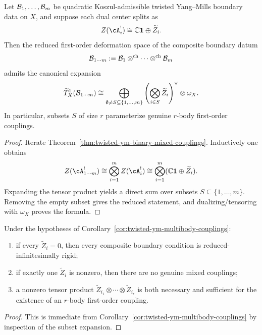 \begin{corollary}
\label{cor:twisted-ym-multibody-couplings}
Let $\mathcal{B}_1,\dots,\mathcal{B}_m$ be quadratic Koszul-admissible twisted Yang--Mills boundary data on $X$, and suppose each dual center splits as
\[
Z(\cA_i^{!}) \cong \mathbb{C}\mathbf{1}\oplus \widetilde Z_i.
\]
Then the reduced first-order deformation space of the composite boundary datum
\[
\mathcal{B}_{1\cdots m}
:=
\mathcal{B}_1\otimes^{\mathrm{ch}}\cdots\otimes^{\mathrm{ch}}\mathcal{B}_m
\]
admits the canonical expansion
\[
\widetilde T^1_X(\mathcal{B}_{1\cdots m})
\cong
\bigoplus_{\emptyset \neq S \subseteq \{1,\dots,m\}}
\left(\bigotimes_{i\in S} \widetilde Z_i\right)^{\vee}\otimes \omega_X.
\]
In particular, subsets $S$ of size $r$ parameterize genuine $r$-body first-order couplings.
\end{corollary}

\begin{proof}
Iterate Theorem~\ref{thm:twisted-ym-binary-mixed-couplings}. Inductively one obtains
\[
Z(\cA_{1\cdots m}^{!})
\cong
\bigotimes_{i=1}^m Z(\cA_i^{!})
\cong
\bigotimes_{i=1}^m (\mathbb{C}\mathbf{1}\oplus \widetilde Z_i).
\]
Expanding the tensor product yields a direct sum over subsets $S\subseteq \{1,\dots,m\}$. Removing the empty subset gives the reduced statement, and dualizing/tensoring with $\omega_X$ proves the formula.
\end{proof}

\begin{corollary}
\label{cor:twisted-ym-mixed-rigidity}
Under the hypotheses of Corollary~\ref{cor:twisted-ym-multibody-couplings}:
\begin{enumerate}[label=(\roman*)]
\item if every $\widetilde Z_i=0$, then every composite boundary condition is reduced-infinitesimally rigid;
\item if exactly one $\widetilde Z_i$ is nonzero, then there are no genuine mixed couplings;
\item a nonzero tensor product $\widetilde Z_{i_1}\otimes\cdots\otimes\widetilde Z_{i_r}$ is both necessary and sufficient for the existence of an $r$-body first-order coupling.
\end{enumerate}
\end{corollary}

\begin{proof}
This is immediate from Corollary~\ref{cor:twisted-ym-multibody-couplings} by inspection of the subset expansion.
\end{proof}

